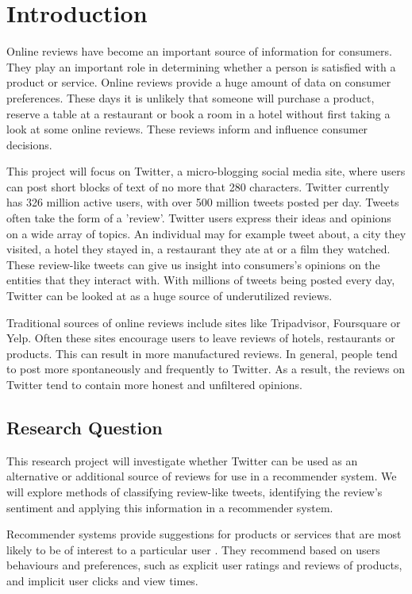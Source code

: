 \chapter{Introduction}
\begin{justify}
Online reviews have become an important source of information for consumers. They play an important role in determining whether a person is satisfied with a product or service. Online reviews provide a huge amount of data on consumer preferences. These days it is unlikely that someone will purchase a product, reserve a table at a restaurant or book a room in a hotel without first taking a look at some online reviews. These reviews inform and influence consumer decisions.
\end{justify}

This project will focus on Twitter, a micro-blogging social media site, where users can post short blocks of text of no more that 280 characters. Twitter currently has 326 million active users, with over 500 million tweets posted per day. Tweets often take the form of a 'review'. Twitter users express their ideas and opinions on a wide array of topics. An individual may for example tweet about, a city they visited, a hotel they stayed in, a restaurant they ate at or a film they watched. These review-like tweets can give us insight into consumers’s opinions on the entities that they interact with. With millions of tweets being posted every day, Twitter can be looked at as a huge source of underutilized reviews.

Traditional sources of online reviews include sites like Tripadvisor, Foursquare or Yelp. Often these sites encourage users to leave reviews of hotels, restaurants or products. This can result in more manufactured reviews. In general, people tend to post more spontaneously and frequently to Twitter. As a result, the reviews on Twitter tend to contain more honest and unfiltered opinions. 

\section{Research Question}
This research project will investigate whether Twitter can be used as an alternative or additional source of reviews for use in a recommender system. We will explore methods of classifying review-like tweets, identifying the review's sentiment and applying this information in a recommender system.

Recommender systems provide suggestions for products or services that are most likely to be of interest to a particular user \cite{Ricci2015}. They recommend based on users behaviours and preferences, such as explicit user ratings and reviews of products, and implicit user clicks and view times.

